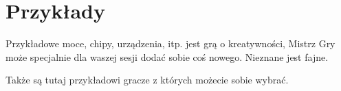 \chapter{Przykłady}
Przykładowe moce, chipy, urządzenia, itp.
\kosmoramus jest grą o kreatywności, Mistrz Gry może specjalnie dla waszej sesji dodać sobie coś nowego.
Nieznane jest fajne.

Także są tutaj przykładowi gracze z których możecie sobie wybrać.








